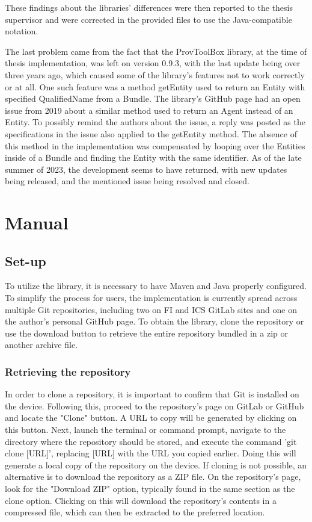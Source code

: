 \documentclass[
  digital,     %
  oneside,     %
  nosansbold,  %
  nocolorbold, %
  lof,         %
  lot,         %
]{fithesis4}
\begin{document}
These findings about the libraries' differences were then reported to the thesis supervisor and were corrected in the provided files to use the Java-compatible notation.

The last problem came from the fact that the ProvToolBox library, at the time of thesis implementation, was left on version 0.9.3, with the last update being over three years ago, which caused some of the library's features not to work correctly or at all. One such feature was a method getEntity used to return an Entity with specified QualifiedName from a Bundle. The library's GitHub page had an open issue from 2019 about a similar method used to return an Agent instead of an Entity. To possibly remind the authors about the issue, a reply was posted as the specifications in the issue also applied to the getEntity method. The absence of this method in the implementation was compensated by looping over the Entities inside of a Bundle and finding the Entity with the same identifier. As of the late summer of 2023, the development seems to have returned, with new updates being released, and the mentioned issue being resolved and closed.
\shorthandon{-}


\chapter{Manual}
\shorthandoff{-}
\section{Set-up}
To utilize the library, it is necessary to have Maven and Java properly configured. To simplify the process for users, the implementation is currently spread across multiple Git repositories, including two on FI and ICS GitLab sites and one on the author's personal GitHub page. To obtain the library, clone the repository or use the download button to retrieve the entire repository bundled in a zip or another archive file.

\subsection{Retrieving the repository}
In order to clone a repository, it is important to confirm that Git is installed on the device. Following this, proceed to the repository's page on GitLab or GitHub and locate the "Clone" button. A URL to copy will be generated by clicking on this button. Next, launch the terminal or command prompt, navigate to the directory where the repository should be stored, and execute the command 'git clone [URL]', replacing [URL] with the URL you copied earlier. Doing this will generate a local copy of the repository on the device. If cloning is not possible, an alternative is to download the repository as a ZIP file. On the repository's page, look for the "Download ZIP" option, typically found in the same section as the clone option. Clicking on this will download the repository's contents in a compressed file, which can then be extracted to the preferred location.
\end{document}
